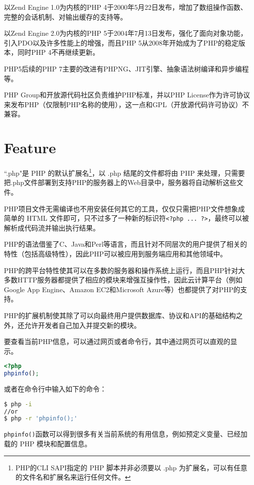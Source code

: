 以Zend Engine 1.0为内核的PHP 4于2000年5月22日发布，增加了数组操作函数、完整的会话机制、对输出缓存的支持等。

以Zend Engine 2.0为内核的PHP 5于2004年7月13日发布，强化了面向对象功能，引入PDO以及许多性能上的增强，而且PHP 5从2008年开始成为了PHP的稳定版本，同时PHP 4不再继续更新。

PHP5后续的PHP 7主要的改进有PHPNG、JIT引擎、抽象语法树编译和异步编程等。



PHP Group和开放源代码社区负责维护PHP标准，并以PHP License作为许可协议来发布PHP（仅限制PHP名称的使用），这一点和GPL（开放源代码许可协议）不兼容。

\section{Feature}


``.php"是 PHP 的默认扩展名\footnote{PHP的CLI SAPI指定的 PHP 脚本并非必须要以 .php 为扩展名，可以有任意的文件名和扩展名来运行任何文件。}，以 .php 结尾的文件都将由 PHP 来处理，只需要把.php文件部署到支持PHP的服务器上的Web目录中，服务器将自动解析这些文件。

PHP项目文件无需编译也不用安装任何其它的工具，仅仅只需把PHP文件想象成简单的 HTML 文件即可，只不过多了一种新的标识符\texttt{<?php ... ?>}，最终可以被解析成代码流并输出执行结果。

PHP的语法借鉴了C、Java和Perl等语言，而且针对不同层次的用户提供了相关的特性（包括高级特性），因此PHP可以被应用到服务端应用和其他领域中。

PHP的跨平台特性使其可以在多数的服务器和操作系统上运行，而且PHP针对大多数HTTP服务器都提供了相应的模块来增强互操作性，因此云计算平台（例如Google App Engine、Amazon EC2和Microsoft Azure等）也都提供了对PHP的支持。

PHP的扩展机制使其除了可以向最终用户提供数据库、协议和API的基础结构之外，还允许开发者自己加入并提交新的模块。

要查看当前PHP信息，可以通过网页或者命令行，其中通过网页可以直观的显示。

\begin{lstlisting}[language=PHP]
<?php
phpinfo();
\end{lstlisting}

或者在命令行中输入如下的命令：

\begin{lstlisting}[language=bash]
$ php -i
//or
$ php -r 'phpinfo();'
\end{lstlisting}

\texttt{phpinfo()}函数可以得到很多有关当前系统的有用信息，例如预定义变量、已经加载的 PHP 模块和配置信息。


